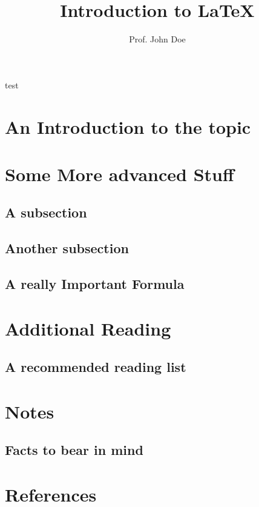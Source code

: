 \documentclass{beamer}
\title{Introduction to \LaTeX}
\author{Prof. John Doe}
\begin{document}
\maketitle
\begin{frame}{test}
	\section{An Introduction to the topic}
	\section{Some More advanced Stuff}
	\subsection{A subsection}
	\subsection{Another subsection}
	\subsection{A really Important Formula}
	\section{Additional Reading}
	\subsection{A recommended reading list}
	\section{Notes}
	\subsection{Facts to bear in mind}
	\section{References}
\end{frame}
\end{document}
